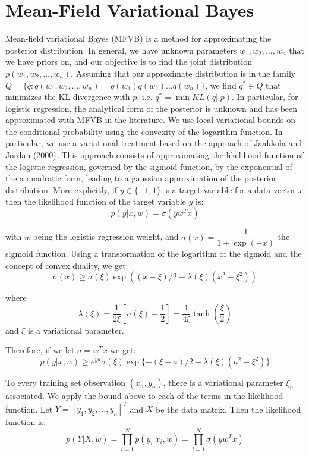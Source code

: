
\section{Mean-Field Variational Bayes}\label{sec:mfvb}

Mean-field variational Bayes (MFVB) is a method for approximating the posterior distribution.  In general, we have unknown parameters $w_1, w_2, \ldots, w_n$ that we have priors on, and our objective is to find the joint distribution $p(w_1, w_2, \ldots, w_n)$.  Assuming that our approximate distribution is in the family $Q = \{q : q(w_1, w_2, \ldots, w_n) = q(w_1)q(w_2) \ldots q(w_n)\}$, we find $q^* \in Q$ that minimizes the KL-divergence with $p$, i.e. $q^* = \min KL(q || p)$. 
In particular, for logistic regression, the analytical form of the posterior is unknown and has been approximated with MFVB in the literature. We use local variational bounds on the conditional probability using the convexity of the logarithm function. In particular, we use a variational treatment based on the approach of Jaakkola and Jordan (2000). 
This approach consists of approximating the likelihood function of the logistic regression, governed by the sigmoid function, by the exponential of the a quadratic form, leading to a gaussian approximation of the posterior distribution. More explicitly, if $y\in \{-1,1\}$ is a target variable for a data vector $x$ then the likelihood function of the target variable $y$ is: 
\begin{equation}
p(y | x, w)=\sigma(y w^T x)
\end{equation}

with $w$ being the logistic regression weight, and $\sigma(x)=\dfrac{1}{1+\exp(-x)}$ the sigmoid function. 
Using a transformation of the logarithm of the sigmoid and the concept of convex duality, we get: 
\begin{equation}
\sigma(x) \geq \sigma(\xi)\exp((x-\xi)/2-\lambda(\xi)(x^2-\xi^2))
\end{equation}

where
$$\lambda(\xi)=\frac{1}{2\xi}[\sigma(\xi)-\frac{1}{2}]=\frac{1}{4\xi}\tanh(\frac{\xi}{2})$$
and $\xi$ is a variational parameter. 

Therefore, if we let $a=w^T x$ we get: 
\begin{equation}
p( y | x,w)\geq e^{ya} \sigma(\xi)\exp\{-(\xi+a)/2-\lambda(\xi)(a^2-\xi^2)\}
\end{equation}

To every training set observation $(x_n, y_n)$, there is a variational parameter $\xi_n$ associated. We apply the bound above to each of the terms in the likelihood function. Let $Y=[y_1, y_2, \ldots , y_n]^T$ and $X$ be the data matrix. Then the likelihood function is: 
\begin{equation}
p( Y | X, w)=\prod_{i=1}^{N} p(y_i | x_i, w) = \prod_{i=1}^{N} \sigma(y w^T x)
\end{equation}


